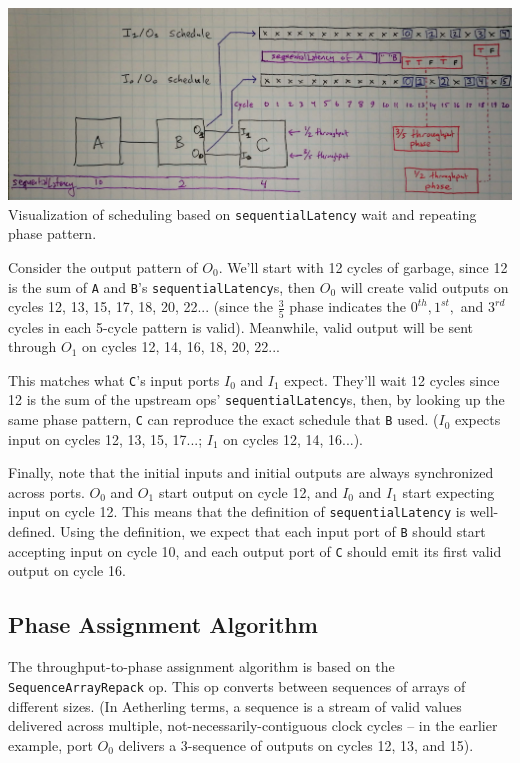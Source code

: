 \documentclass[12pt]{article}
\begin{document}
\begin{center}
\includegraphics[width=1.0\linewidth]{Figures/phase.jpg}
Visualization of scheduling based on \texttt{sequentialLatency}
wait and repeating phase pattern.
\end{center}

Consider the output pattern of $O_0$. We'll start with 12 cycles of
garbage, since 12 is the sum of \texttt{A} and \texttt{B}'s
\texttt{sequentialLatency}s, then $O_0$ will create valid outputs on
cycles 12, 13, 15, 17, 18, 20, 22... (since the $\frac{3}{5}$ phase
indicates the $0^{th}, 1^{st},$ and $3^{rd}$ cycles in each 5-cycle
pattern is valid). Meanwhile, valid output will be sent through $O_1$
on cycles 12, 14, 16, 18, 20, 22...

This matches what \texttt{C}'s input ports $I_0$ and $I_1$
expect. They'll wait 12 cycles since 12 is the sum of the upstream
ops' \texttt{sequentialLatency}s, then, by looking up the same phase
pattern, \texttt{C} can reproduce the exact schedule that \texttt{B}
used. ($I_0$ expects input on cycles 12, 13, 15, 17...; $I_1$ on
cycles 12, 14, 16...).

Finally, note that the initial inputs and initial outputs are always
synchronized across ports. $O_0$ and $O_1$ start output on cycle 12,
and $I_0$ and $I_1$ start expecting input on cycle 12. This means that
the definition of \texttt{sequentialLatency} is well-defined. Using
the definition, we expect that each input port of \texttt{B} should
start accepting input on cycle 10, and each output port of \texttt{C}
should emit its first valid output on cycle 16.

\subsection{Phase Assignment Algorithm}

The throughput-to-phase assignment algorithm is based on the
\texttt{SequenceArrayRepack} op. This op converts between
sequences of arrays of different sizes. (In Aetherling terms, a
sequence is a stream of valid values delivered across multiple,
not-necessarily-contiguous clock cycles -- in the earlier
example, port $O_0$ delivers a 3-sequence of outputs on cycles
12, 13, and 15).
\end{document}

